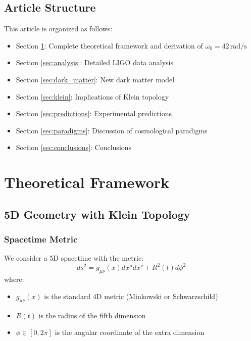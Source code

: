 \documentclass[12pt,a4paper]{article}
\begin{document}
\subsection{Article Structure}

This article is organized as follows:
\begin{itemize}
    \item Section \ref{sec:framework}: Complete theoretical framework and derivation of $\omega_0 = 42\,\mathrm{rad/s}$
    \item Section \ref{sec:analysis}: Detailed LIGO data analysis
    \item Section \ref{sec:dark_matter}: New dark matter model
    \item Section \ref{sec:klein}: Implications of Klein topology
    \item Section \ref{sec:predictions}: Experimental predictions
    \item Section \ref{sec:paradigms}: Discussion of cosmological paradigms
    \item Section \ref{sec:conclusions}: Conclusions
\end{itemize}

\section{Theoretical Framework}
\label{sec:framework}

\subsection{5D Geometry with Klein Topology}

\subsubsection{Spacetime Metric}

We consider a 5D spacetime with the metric:
\begin{equation}
ds^2 = g_{\mu\nu}(x) dx^\mu dx^\nu + R^2(t) d\phi^2
\end{equation}
where:
\begin{itemize}
    \item $g_{\mu\nu}(x)$ is the standard 4D metric (Minkowski or Schwarzschild)
    \item $R(t)$ is the radius of the fifth dimension
    \item $\phi \in [0, 2\pi]$ is the angular coordinate of the extra dimension
\end{itemize}
\end{document}
